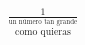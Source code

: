 \documentclass[preview]{standalone}
\begin{document}
\begin{align*}
{\frac{1}{\stackrel{\textstyle\text{un número tan grande}}{\text{como quieras}}}}
\end{align*}
\end{document}
